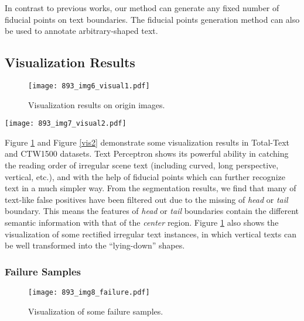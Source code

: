 \documentclass[letterpaper]{article} \usepackage{aaai20}  \usepackage{times}  \usepackage{helvet} \usepackage{courier}  \usepackage[hyphens]{url}  \usepackage{graphicx} \urlstyle{rm} \def\UrlFont{\rm}  \usepackage{graphicx}  \frenchspacing  \setlength{\pdfpagewidth}{8.5in}  \setlength{\pdfpageheight}{11in}  \usepackage{amsmath}
\begin{document}
In contrast to previous works, our method can generate any fixed number of fiducial points on text boundaries. The fiducial points generation method  can also be used to annotate arbitrary-shaped text.

\subsection{Visualization Results}
\begin{figure}[ht]
	\centering
	\texttt{[image: 893\_img6\_visual1.pdf]}\\
	\caption{Visualization results on origin images.
	}
	\label{vis1}
\end{figure}
\begin{figure*}[htbp]
\begin{center}
\texttt{[image: 893\_img7\_visual2.pdf]}\\
\end{center}
   \caption{Visualization result on Total-Text and CTW1500. The first row displays the segmented results and the second row shows the end-to-end results. Fiducial points are also visualized as colored points on text boundaries.}
\label{vis2}
\end{figure*}


Figure \ref{vis1} and Figure \ref{vis2} demonstrate some visualization results in Total-Text and CTW1500 datasets. Text Perceptron shows its powerful ability in catching the reading order of irregular scene text  (including curved, long perspective, vertical, etc.), and with the help of fiducial points which can further recognize text in a much simpler way. From the segmentation results, we find that many of text-like false positives have been filtered out due to the missing of \emph{head} or \emph{tail} boundary. This means the features of \emph{head} or \emph{tail} boundaries contain the different semantic information with that of the \emph{center} region. Figure \ref{vis1} also shows the visualization of some rectified irregular text instances, in which vertical texts can be well transformed into the ``lying-down'' shapes.

\subsubsection{Failure Samples}
\begin{figure}[t]
\begin{center}
\texttt{[image: 893\_img8\_failure.pdf]}\\
\end{center}
   \caption{Visualization of some failure samples.}
\label{fail}
\end{figure}
\end{document}
